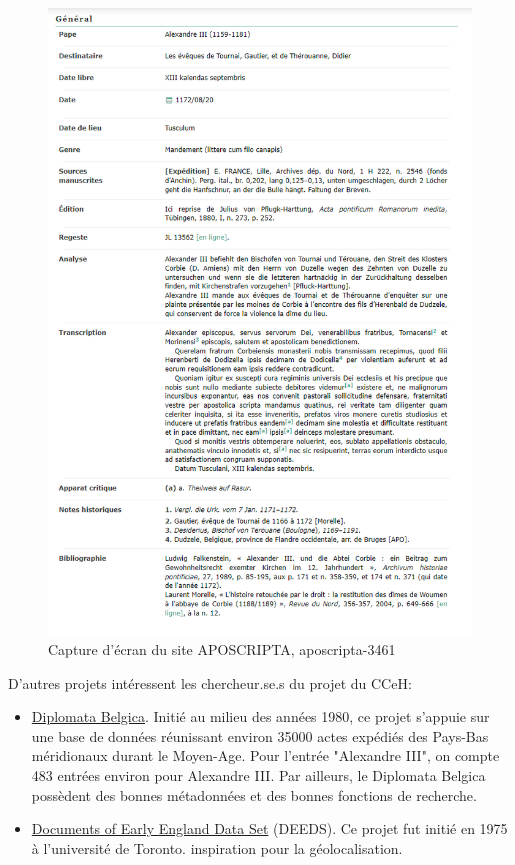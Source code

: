 \begin{figure}[h]
    \centering
    \includegraphics[width=12cm]{images/aposcripta-3461.png}
    \caption{Capture d'écran du site APOSCRIPTA, aposcripta-3461}
    \label{fig:Aposcripta}
\end{figure}


\noindent D'autres projets intéressent les chercheur.se.s du projet du CCeH: 
\begin{itemize}
    \item \href{https://www.diplomata-belgica.be/colophon_fr.html}{Diplomata Belgica}. Initié au milieu des années 1980, ce projet s'appuie sur une base de données réunissant environ 35000 actes expédiés des Pays-Bas méridionaux durant le Moyen-Age. Pour l'entrée "Alexandre III", on compte 483 entrées environ pour Alexandre III. Par ailleurs, le Diplomata Belgica possèdent des bonnes métadonnées et des bonnes fonctions de recherche.
    \item \href{https://deeds.library.utoronto.ca/}{Documents of Early England Data Set} (DEEDS). Ce projet fut initié en 1975 à l'université de Toronto.  inspiration pour la géolocalisation.\\
    
\end{itemize}



